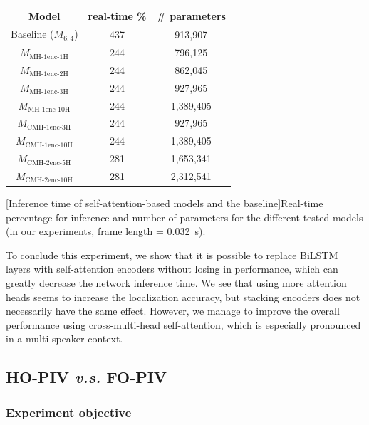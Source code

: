 \begin{table}[t]
    \centering
    \begin{tabular}{|c|cc|}
    \hline
    \textbf{Model}  & \textbf{real-time \%} & \textbf{\# parameters} \\ \hline
    Baseline ($M_{6,4}$) & 437  & 913,907    \\
    $M_{\text{MH-}1\text{enc-}1\text{H}}$      & 244  & 796,125    \\
    $M_{\text{MH-}1\text{enc-}2\text{H}}$      & 244  & 862,045    \\
    $M_{\text{MH-}1\text{enc-}3\text{H}}$      & 244  & 927,965    \\
    $M_{\text{MH-}1\text{enc-}10\text{H}}$     & 244  & 1,389,405  \\
    $M_{\text{CMH-}1\text{enc-}3\text{H}}$      & 244  & 927,965    \\
    $M_{\text{CMH-}1\text{enc-}10\text{H}}$     & 244  & 1,389,405  \\
    $M_{\text{CMH-}2\text{enc-}5\text{H}}$      & 281  & 1,653,341  \\
    $M_{\text{CMH-}2\text{enc-}10\text{H}}$     & 281  & 2,312,541  \\ \hline
    \end{tabular}
    [Inference time of self-attention-based models and the baseline]{Real-time percentage for inference and number of parameters for the different tested models (in our experiments, frame length = 0.032~s).}
    \label{tab:multiLoca_inferenceTimes}
\end{table}

To conclude this experiment, we show that it is possible to replace BiLSTM layers with self-attention encoders without losing in performance, which can greatly decrease the network inference time. We see that using more attention heads seems to increase the localization accuracy, but stacking encoders does not necessarily have the same effect. However, we manage to improve the overall performance using cross-multi-head self-attention, which is especially pronounced in a multi-speaker context.

\subsection{HO-PIV \emph{v.s.} FO-PIV}
\label{ss:hoaExperiment}

\subsubsection{Experiment objective}


